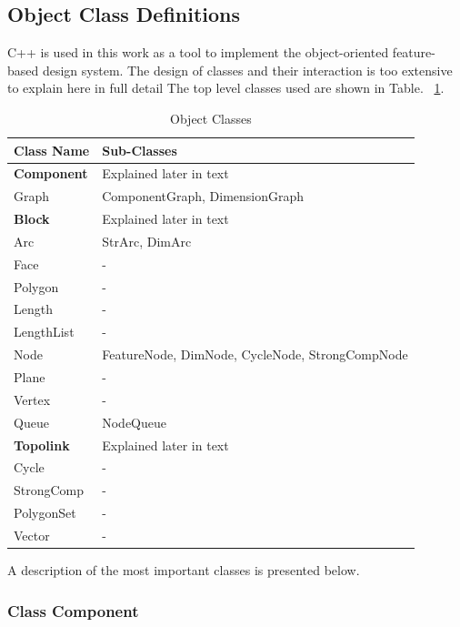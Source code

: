 		\subsection{Object Class Definitions}
		
		C++ is used in this work as a tool to implement the object-oriented 
		feature-based design system. The design of classes and their 
		interaction is too extensive to explain here in full detail
		The top level classes used are shown in Table. ~\ref{cla}.

        \begin{table}[htbp]
        \begin{tabular}{|l|l|}
        \hline
        \bf Class Name  &   \bf Sub-Classes \\
        \hline
        \hline
        {\bf Component} &  Explained later in text \\
        \hline
		Graph	& ComponentGraph, DimensionGraph \\
        \hline
		{\bf Block} & Explained later in text \\
		\hline
		Arc & StrArc, DimArc \\
		\hline
		Face & - \\
		\hline
		Polygon & - \\
		\hline
		Length & - \\
		\hline
		LengthList & - \\
		\hline
		Node & FeatureNode, DimNode, CycleNode, StrongCompNode \\
		\hline
		Plane & - \\
		\hline
		Vertex & - \\
		\hline
		Queue & NodeQueue \\
		\hline
		{\bf Topolink} & Explained later in text \\
		\hline
		Cycle & - \\
		\hline
		StrongComp & - \\
		\hline
		PolygonSet & - \\
		\hline
		Vector & - \\
		\hline
        \end{tabular}
        \caption{Object Classes}
        \label{cla}
        \end{table}

		A description of the most important classes is presented below.

		\subsubsection{ Class Component}

